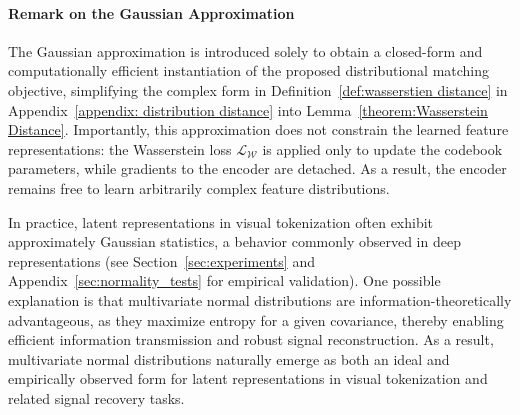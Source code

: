 



\paragraph{Remark on the Gaussian Approximation}
The Gaussian approximation is introduced solely to obtain a closed-form and computationally efficient instantiation of the proposed distributional matching objective, simplifying the complex form in Definition~\ref{def:wasserstien distance} in Appendix~\ref{appendix: distribution distance} into Lemma~\ref{theorem:Wasserstein Distance}.
Importantly, this approximation does not constrain the learned feature representations:
the Wasserstein loss $\mathcal{L}_{\mathcal{W}}$ is applied only to update the codebook parameters, while gradients to the encoder are detached.
As a result, the encoder remains free to learn arbitrarily complex feature distributions.

In practice, latent representations in visual tokenization often exhibit approximately Gaussian statistics, a behavior commonly observed in deep representations (see Section~\ref{sec:experiments} and Appendix~\ref{sec:normality_tests} for empirical validation). One possible explanation is that multivariate normal distributions are information-theoretically advantageous, as they maximize entropy for a given covariance, thereby enabling efficient information transmission and robust signal reconstruction. As a result, multivariate normal distributions naturally emerge as both an ideal and empirically observed form for latent representations in visual tokenization and related signal recovery tasks.

